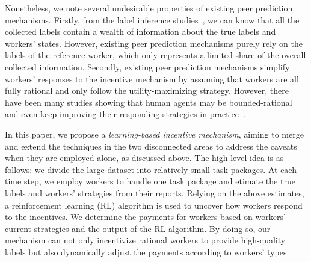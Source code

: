 Nonetheless, we note several undesirable properties of existing peer prediction mechanisms.
Firstly, from the label inference studies~\cite{zheng2017truth}, we can know that all the collected labels contain a wealth of information about the true labels and workers' states.
However, existing peer prediction mechanisms purely rely on the labels of the reference worker, which only represents a limited share of the overall collected information.
Secondly, existing peer prediction mechanisms simplify workers' responses to the incentive mechanism by assuming that workers are all fully rational and only follow the utility-maximizing strategy.
However, there have been many studies showing that human agents may be bounded-rational and even keep improving their responding strategies in practice~\cite{simon1982models,chastain2014algorithms,gao2014trick}.




In this paper, we propose a \emph{learning-based incentive mechanism}, aiming to merge and extend the techniques in the two disconnected areas to address the caveats when they are employed alone, as discussed above.
The high level idea is as follows: we divide the large dataset into relatively small task packages. At each time step, we employ workers to handle one task package and etimate the true labels and workers' strategies from their reports.
Relying on the above estimates, a reinforcement learning (RL) algorithm is used to uncover how workers respond to the incentives.
We determine the payments for workers based on workers' current strategies and the output of the RL algorithm.
By doing so, our mechanism can not only incentivize rational workers to provide high-quality labels but also dynamically adjust the payments according to workers' types.




